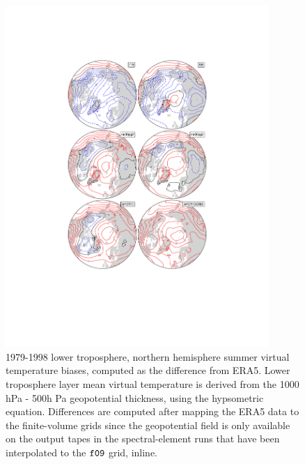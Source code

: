 \documentclass[draft]{agujournal2019}
\begin{document}
\begin{figure}[t]
\begin{center}
         \includegraphics[width=100mm]{figs/temp_contours_diffERA5_Thyps.pdf}
\end{center}
\caption{1979-1998 lower troposphere, northern hemisphere summer virtual temperature biases, computed as the difference from ERA5. Lower troposphere layer mean virtual temperature is derived from the 1000 hPa - 500h Pa geopotential thickness, using the hypsometric equation. Differences are computed after mapping the ERA5 data to the finite-volume grids since the geopotential field is only available on the output tapes in the spectral-element runs that have been interpolated to the $\tt f09$ grid, inline.}
\label{fig:dThyps}
\end{figure}
\end{document}
